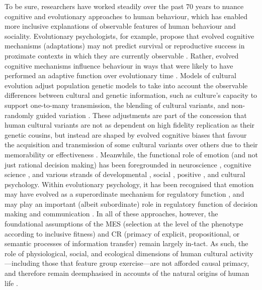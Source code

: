 \begin{CJK}{UTF8}{gbsn}
To be sure, researchers have worked steadily over the past 70 years to nuance cognitive and evolutionary approaches to human behaviour, which has enabled more inclusive explanations of observable features of human behaviour and sociality.  Evolutionary psychologists, for example, propose that evolved cognitive mechanisms (adaptations) may not predict survival or reproductive success in proximate contexts in which they are currently observable \citep[as per the assumption utilised in human behavioural ecology known as the ``phenotypic gambit;'' see][]{Grafen1984}.  Rather, evolved cognitive mechanisms influence behaviour in ways that were likely to have performed an adaptive function over evolutionary time \citep[a theoretical formulation known as the ``environment of evolutionary adaptiveness'' (EEA)][]{Cosmides1992a,Buss1998}.  Models of cultural evolution adjust population genetic models to take into account the observable differences between cultural and genetic information, such as culture's capacity to support one-to-many transmission, the blending of cultural variants, and non-randomly guided variation \citep{Cavalli-Sforza1981,Boyd1988}.  These adjustments are part of the concession that human cultural variants are not as dependent on high fidelity replication as their genetic cousins, but instead are shaped by evolved cognitive biases that favour the acquisition and transmission of some cultural variants over others due to their memorability or effectiveness \citep[i.e., context sensitivity; see][]{Henrich2007}.
Meanwhile, the functional role of emotion (and not just rational decision making) has been foregrounded in neuroscience \citep{Damasio1994}, cognitive science \citep{Lazarus1982}, and various strands of developmental \citep{Campos1989}, social \citep{Parrott2001}, positive \citep{Fredrickson2001}, and cultural \citep{Nisbett2003} psychology.
Within evolutionary psychology, it has been recognised that emotion may have evolved as a superordinate mechanism for regulatory function \citep{Cosmides2000}, and may play an important (albeit subordinate) role in regulatory function of decision making \citep{Dalgleish2004} and communication \citep{Rime2009}.  In all of these approaches, however, the foundational assumptions of the MES (selection at the level of the phenotype according to inclusive fitness) and CR (primacy of explicit, propositional, or semantic processes of information transfer) remain largely in-tact.  As such, the role of physiological, social, and ecological dimensions of human cultural activity---including those that feature group exercise---are not afforded causal primacy, and therefore remain deemphasised in accounts of the natural origins of human life \citep{Badcock2012}.


\end{CJK}
